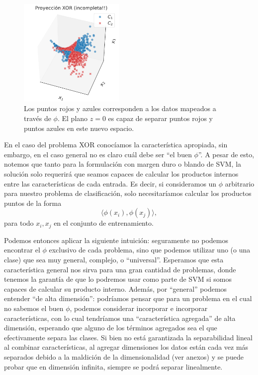 \begin{figure}[ht]
    \centering
    \includegraphics[width=0.45\textwidth]{img/cap5_xor_3d_proyeccion}
    \caption{Los puntos rojos y azules corresponden a los datos mapeados a través de $\phi$. El plano $z=0$ es capaz de separar puntos rojos y puntos azules en este nuevo espacio.}
    \label{fig:xor_proyectado}
\end{figure}


\begin{remark}
En el caso del problema XOR conocíamos la característica apropiada, sin embargo, en el caso general no es claro cuál debe ser ``el buen $\phi$''. A pesar de esto, notemos que tanto para la formulación con margen duro o blando de SVM, la solución solo requerirá que seamos capaces de calcular los productos internos entre las características de cada entrada. Es decir, si consideramos un $\phi$ arbitrario para nuestro problema de clasificación, solo necesitaríamos calcular los productos puntos de la forma
\begin{equation}
    \langle \phi(x_i) , \phi(x_j) \rangle, 
\end{equation}
para todo $x_i,x_j$ en el conjunto de entrenamiento. 
\end{remark}

Podemos entonces aplicar la siguiente intuición: seguramente no podemos encontrar el $\phi$ exclusivo de cada problema, sino que podemos utilizar uno (o una clase) que sea muy general, complejo, o ``universal''. Esperamos que esta característica general nos sirva para una gran cantidad de problemas, donde tenemos la garantía de que lo podremos usar como parte de SVM si somos capaces de calcular su producto interno. Además, por ``general'' podemos entender ``de alta dimensión'': podríamos pensar que para un problema en el cual no sabemos el buen $\phi$, podemos considerar incorporar e incorporar características, con lo cual tendríamos una ``característica agregada'' de alta dimensión, esperando que alguno de los términos agregados sea el que efectivamente separa las clases. Si bien no está garantizada la separabilidad lineal al combinar características, al agregar dimensiones los datos están cada vez más separados debido a la maldición de la dimensionalidad (ver anexos) y se puede probar que en dimensión infinita, siempre se podrá separar linealmente.

